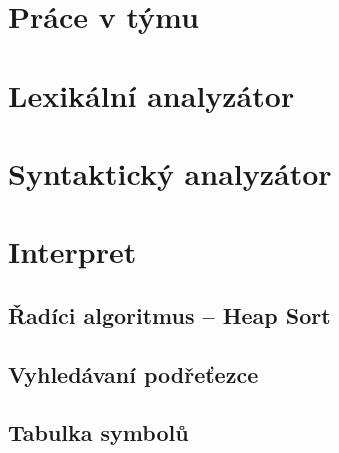\documentclass[a4paper, 12pt]{article}
\begin{document}
\section{Práce v týmu}

\section{Lexikální analyzátor} \label{lexer}

\section{Syntaktický analyzátor} \label{parser}

\section{Interpret} \label{interpret}

\subsection{Řadíci algoritmus -- Heap Sort}
\subsection{Vyhledávaní podřeťezce}
\subsection{Tabulka symbolů}
\end{document}

